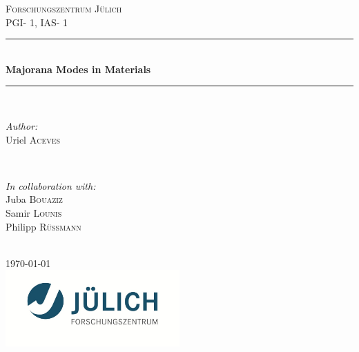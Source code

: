 \documentclass[11pt,twoside,a4paper]{article} %
\begin{document}

\begin{titlepage}
\newcommand{\HRule}{\rule{\linewidth}{0.5mm}} %

\center %
\textsc{\LARGE Forschungszentrum Jülich\\\vspace{1cm}PGI- 1, IAS- 1}\\[5cm] %

\HRule \\[0.4cm]
{ \huge \bfseries Majorana Modes in Materials}\\[0.4cm] %
\HRule \\[1cm]

\begin{minipage}{0.4\textwidth}
\begin{flushleft} \large
\emph{Author:}\\
Uriel \textsc{Aceves} %
\end{flushleft}
\end{minipage}
~
\begin{minipage}{0.4\textwidth}
\begin{flushright} \large
\emph{In collaboration with:} \\
Juba \textsc{Bouaziz} \\%
Samir \textsc{Lounis}\\ %
Philipp \textsc{Rüßmann} %
\end{flushright}
\end{minipage}\\[3cm]

{\large \today}\\[5cm] %

\includegraphics[width=0.5\textwidth]{logo.jpeg}\\[1cm] %

\vfill %

\end{titlepage}
\end{document}
